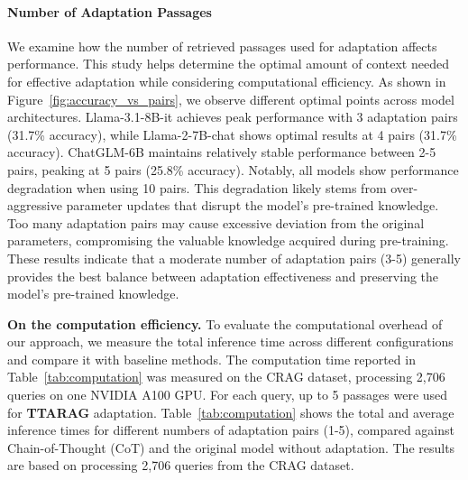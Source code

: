 \documentclass{article}
\newcommand{\ourmethod}{{\fontfamily{lmtt}\selectfont \textbf{TTARAG}}\xspace}
\begin{document}
\paragraph{Number of Adaptation Passages} We examine how the number of retrieved passages used for adaptation affects performance. This study helps determine the optimal amount of context needed for effective adaptation while considering computational efficiency. As shown in Figure~\ref{fig:accuracy_vs_pairs}, we observe different optimal points across model architectures. Llama-3.1-8B-it achieves peak performance with 3 adaptation pairs (31.7\% accuracy), while Llama-2-7B-chat shows optimal results at 4 pairs (31.7\% accuracy). ChatGLM-6B maintains relatively stable performance between 2-5 pairs, peaking at 5 pairs (25.8\% accuracy). Notably, all models show performance degradation when using 10 pairs. This degradation likely stems from over-aggressive parameter updates that disrupt the model's pre-trained knowledge. Too many adaptation pairs may cause excessive deviation from the original parameters, compromising the valuable knowledge acquired during pre-training. These results indicate that a moderate number of adaptation pairs (3-5) generally provides the best balance between adaptation effectiveness and preserving the model's pre-trained knowledge.
\fi



\noindent\textbf{On the computation efficiency.}
To evaluate the computational overhead of our approach, we measure the total inference time across different configurations and compare it with baseline methods. The computation time reported in Table~\ref{tab:computation} was measured on the CRAG dataset, processing 2,706 queries on one NVIDIA A100 GPU. For each query, up to 5 passages were used for \ourmethod adaptation. Table~\ref{tab:computation} shows the total and average inference times for different numbers of adaptation pairs (1-5), compared against Chain-of-Thought (CoT) and the original model without adaptation. The results are based on processing 2,706 queries from the CRAG dataset.
\end{document}
